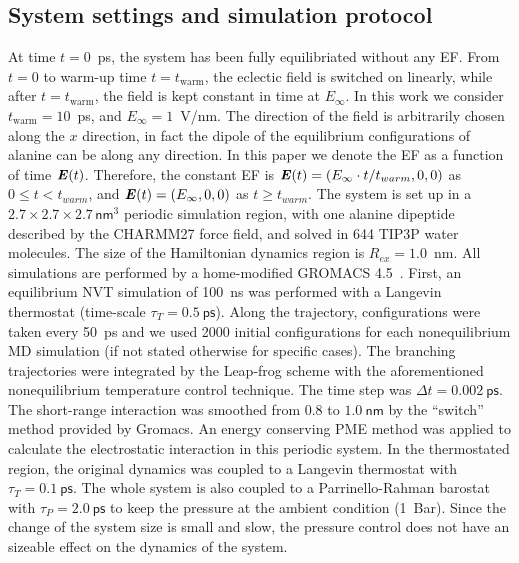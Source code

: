 \documentclass[a4paper,preprint,unsortedaddress,onecolumn]{revtex4-1}
\newcommand{\vect}[1]{\textbf{\textit{#1}}}
\begin{document}
\subsection{System settings and simulation protocol}
At time $t=0$~ps, the system
has been fully equilibriated without any EF. From $t=0$ to
warm-up time $t=t_{\textrm{warm}}$, the eclectic field is switched on linearly, while
after $t=t_{\textrm{warm}}$, the field is kept constant in time at
$E_{\infty}$.  In this work we consider $t_{\textrm{warm}} = 10$~ps,
and $E_{\infty} = 1$~V/nm.
The direction of the field is arbitrarily chosen along the
$x$ direction, in fact the dipole of the equilibrium configurations of
alanine can be along any direction.
In this paper we denote the
EF as a function of time $\vect E(t)$.
Therefore, the constant EF is
$\vect E(t) = (E_\infty\cdot t/t_{warm},0,0)$ as $0\leq t < t_{warm}$, and 
$\vect E(t) = (E_\infty,0,0)$
as $t \geq t_{warm}$.
The system is set up in a $2.7\times 2.7\times
2.7\, \textsf{nm}^3$ periodic simulation region, with one alanine dipeptide
described by the CHARMM27 force field, and solved in 644 TIP3P
water molecules.
The size of the  Hamiltonian dynamics region is $R_{ex} = 1.0$~nm.
All simulations are performed by a home-modified GROMACS 4.5~\cite{pronk2013gromacs}.
First, an equilibrium NVT simulation of
100~\textsf{ns} was performed with a Langevin thermostat (time-scale
$\tau_T = 0.5~\textsf{ps}$).  Along the trajectory, configurations were taken every
50~\textsf{ps} and we used 2000 initial configurations for each nonequilibrium
MD simulation (if not stated otherwise for specific cases).
The branching trajectories were integrated by the
Leap-frog scheme with the aforementioned nonequilibrium
temperature control technique.  The
time step was $\Delta t = 0.002~\textsf{ps}$. The short-range
interaction was smoothed from $0.8$ to $1.0~\textsf{nm}$ by the
``switch'' method provided by Gromacs.  An energy conserving PME
method was applied to calculate the electrostatic interaction in this
periodic system. In the thermostated region, the original dynamics was
coupled to a Langevin thermostat with $\tau_T = 0.1~\textsf{ps}$.
The whole system is also coupled to a Parrinello-Rahman barostat with $\tau_P = 2.0~\textsf{ps}$ to keep
the pressure at the ambient condition (1~Bar). Since the
change of the system size is small and slow, the pressure control
does not have an sizeable effect on the
dynamics of the system.
\end{document}
